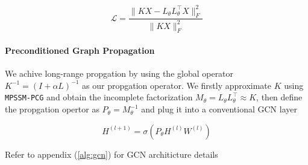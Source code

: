 \begin{equation}\label{eq:training_loss}
    \mathcal L =
    \frac{
        \lVert KX - L_\theta L^\top_\theta X \rVert^2_F
    }{
        \lVert KX \rVert^2_F
    }
\end{equation}

\paragraph{Preconditioned Graph Propagation} We achive long-range propgation by
using the global operator $K^{-1} =(I + \alpha L)^{-1}$ as our propgation
operator. We firstly approximate $K$ using \texttt{MPSSM-PCG} and obtain the
incomplete factorization $M_\theta = L_\theta L^\top_\theta \approx K$, then define the propgation
opertor as $P_\theta = M^{-1}_\theta$ and plug it into a conventional GCN layer

\begin{equation*}
    H^{(l + 1)} = \sigma(P_\theta H^{(l)} W^{(l)})
\end{equation*}

Refer to appendix (\ref{alg:gcn}) for GCN architicture details
